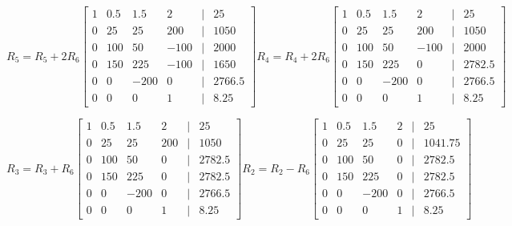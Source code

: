 \documentclass[11pt]{article}
\begin{document}
\begin{enumerate}
\begin{enumerate}
\[
    R_5 = R_5 + 2R_6
    \begin{bmatrix}
        1 & 0.5 & 1.5 & 2 &|& 25 \\
        0 & 25 & 25 & 200 &|& 1050 \\
        0 & 100 & 50 & -100 &|& 2000 \\
        0 & 150 & 225 & -100 &|& 1650 \\
        0 & 0 & -200 & 0 &|& 2766.5 \\
        0 & 0 & 0 & 1 &|& 8.25
    \end{bmatrix}
    R_4 = R_4 + 2R_6
    \begin{bmatrix}
        1 & 0.5 & 1.5 & 2 &|& 25 \\
        0 & 25 & 25 & 200 &|& 1050 \\
        0 & 100 & 50 & -100 &|& 2000 \\
        0 & 150 & 225 & 0 &|& 2782.5 \\
        0 & 0 & -200 & 0 &|& 2766.5 \\
        0 & 0 & 0 & 1 &|& 8.25
    \end{bmatrix}
\]

\[
    R_3 = R_3 + R_6
    \begin{bmatrix}
        1 & 0.5 & 1.5 & 2 &|& 25 \\
        0 & 25 & 25 & 200 &|& 1050 \\
        0 & 100 & 50 & 0 &|& 2782.5 \\
        0 & 150 & 225 & 0 &|& 2782.5 \\
        0 & 0 & -200 & 0 &|& 2766.5 \\
        0 & 0 & 0 & 1 &|& 8.25
    \end{bmatrix}
    R_2 = R_2 - R_6
    \begin{bmatrix}
        1 & 0.5 & 1.5 & 2 &|& 25 \\
        0 & 25 & 25 & 0 &|& 1041.75 \\
        0 & 100 & 50 & 0 &|& 2782.5 \\
        0 & 150 & 225 & 0 &|& 2782.5 \\
        0 & 0 & -200 & 0 &|& 2766.5 \\
        0 & 0 & 0 & 1 &|& 8.25
    \end{bmatrix}
\]


\end{enumerate}
\end{enumerate}
\end{document}
